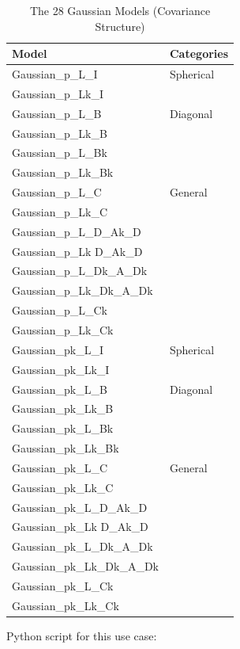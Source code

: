 \begin{table}
\centering
 \begin{tabular}{|l|l|}\hline
Model   &   Categories  \\\hline
Gaussian\_p\_L\_I   &  Spherical\\ 
Gaussian\_p\_Lk\_I   &    \\ \hline
Gaussian\_p\_L\_B   &  Diagonal\\
Gaussian\_p\_Lk\_B   &    \\
Gaussian\_p\_L\_Bk   &    \\
Gaussian\_p\_Lk\_Bk   &    \\\hline
Gaussian\_p\_L\_C   &   General \\
Gaussian\_p\_Lk\_C   &    \\
Gaussian\_p\_L\_D\_Ak\_D   &    \\
Gaussian\_p\_Lk D\_Ak\_D   &    \\
Gaussian\_p\_L\_Dk\_A\_Dk   &    \\
Gaussian\_p\_Lk\_Dk\_A\_Dk   &    \\
Gaussian\_p\_L\_Ck   &    \\
Gaussian\_p\_Lk\_Ck   &    \\\hline
Gaussian\_pk\_L\_I   &  Spherical\\ 
Gaussian\_pk\_Lk\_I   &    \\ \hline
Gaussian\_pk\_L\_B   &  Diagonal\\
Gaussian\_pk\_Lk\_B   &    \\
Gaussian\_pk\_L\_Bk   &    \\
Gaussian\_pk\_Lk\_Bk   &    \\\hline
Gaussian\_pk\_L\_C   &   General \\
Gaussian\_pk\_Lk\_C   &    \\
Gaussian\_pk\_L\_D\_Ak\_D   &    \\
Gaussian\_pk\_Lk D\_Ak\_D   &    \\
Gaussian\_pk\_L\_Dk\_A\_Dk   &    \\
Gaussian\_pk\_Lk\_Dk\_A\_Dk   &    \\
Gaussian\_pk\_L\_Ck   &    \\
Gaussian\_pk\_Lk\_Ck   &    \\\hline
\end{tabular}
\caption{The 28 Gaussian Models (Covariance Structure) \label{tab:listCovarianceModels}}
\end{table}

\espace
Python script for this use case:

